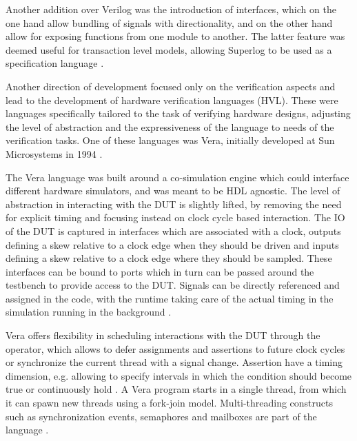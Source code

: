 Another addition over Verilog was the introduction of interfaces, which on the one hand allow bundling of signals
with directionality, and on the other hand allow for exposing functions from one module to another. The latter
feature was deemed useful for transaction level models, allowing Superlog to be used as a specification language
\cite[Sec. 6]{flake2020a}.

Another direction of development focused only on the verification aspects and lead to the development of hardware
verification languages (HVL). These were languages specifically tailored to the task of verifying hardware designs,
adjusting the level of abstraction and the expressiveness of the language to needs of the verification tasks. One of
these languages was Vera, initially developed at Sun Microsystems in 1994 \cite[Sec. 7]{flake2020a}.

The Vera language was built around a co-simulation engine which could interface different hardware simulators, and
was meant to be HDL agnostic. The level of abstraction in interacting with the DUT is slightly lifted, by removing
the need for explicit timing and focusing instead on clock cycle based interaction. The IO of the DUT is captured in
interfaces which are associated with a clock, outputs defining a skew relative to a clock edge when they should be
driven and inputs defining a skew relative to a clock edge where they should be sampled. These interfaces can be
bound to ports which in turn can be passed around the testbench to provide access to the DUT. Signals can be directly
referenced and assigned in the code, with the runtime taking care of the actual timing in the simulation running in
the background \cite[Sec. 7]{flake2020a}.

Vera offers flexibility in scheduling interactions with the DUT through the \ttt{\@} operator, which allows to defer
assignments and assertions to future clock cycles or synchronize the current thread with a signal change. Assertion
have a timing dimension, e.g. allowing to specify intervals in which the condition should become true or continuously
hold . A Vera program starts in a single thread, from which it can spawn new threads using a fork-join model.
Multi-threading constructs such as synchronization events, semaphores and mailboxes are part of the language
\cite[Sec. 7]{flake2020a}.

